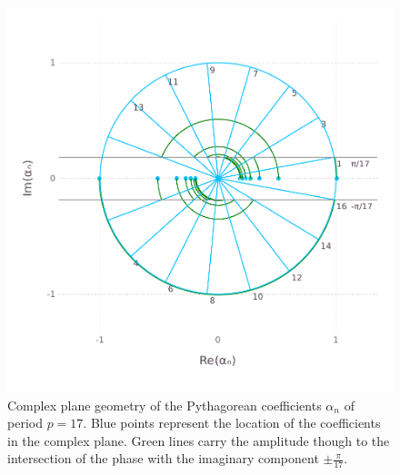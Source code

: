 \begin{figure}[!ht]
	\centering
	\includegraphics[natwidth=13cm,natheight=13cm]{pythagorean-17.pdf}
	\caption[Pythagorean coefficients for $p=17$]{Complex plane geometry of the Pythagorean coefficients $\alpha_n$ of period $p=17$. Blue points represent the location of the coefficients in the complex plane. Green lines carry the amplitude though to the intersection of the phase with the imaginary component $\pm \frac{\pi}{17}$.}
	\label{fig:pythagorean-17}
\end{figure}